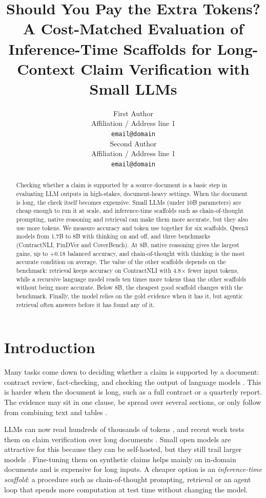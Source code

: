 \documentclass[11pt]{article}
\title{Should You Pay the Extra Tokens? A Cost-Matched Evaluation of Inference-Time Scaffolds for Long-Context Claim Verification with Small LLMs}
\author{First Author \\
  Affiliation / Address line 1 \\
  \texttt{email@domain} \\\And
  Second Author \\
  Affiliation / Address line 1 \\
  \texttt{email@domain} \\}
\begin{document}
\maketitle
\begin{abstract}
Checking whether a claim is supported by a source document is a basic step
in evaluating LLM outputs in high-stakes, document-heavy settings. When the
document is long, the check itself becomes expensive. Small LLMs (under 10B
parameters) are cheap enough to run it at scale, and inference-time
scaffolds such as chain-of-thought prompting, native reasoning and
retrieval can make them more accurate, but they also use more tokens. We
measure accuracy and token use together for six scaffolds, Qwen3 models
from 1.7B to 8B with thinking on and off, and three benchmarks
(ContractNLI, FinDVer and CoverBench). At 8B, native reasoning gives the
largest gains, up to $+0.18$ balanced accuracy, and chain-of-thought with
thinking is the most accurate condition on average. The value of the other
scaffolds depends on the benchmark: retrieval keeps accuracy on
ContractNLI with 4.8$\times$ fewer input tokens, while a recursive language
model reads ten times more tokens than the other scaffolds without being
more accurate. Below 8B, the cheapest good scaffold changes with the
benchmark. Finally, the model relies on the gold evidence when it has it,
but agentic retrieval often answers before it has found any of it.
\end{abstract}

\section{Introduction}
\label{sec:intro}

Many tasks come down to deciding whether a claim is supported by a
document: contract review, fact-checking, and checking the output of
language models \citep{jacovi2024coverbench}. This is harder when the
document is long, such as a full contract or a quarterly report. The
evidence may sit in one clause, be spread over several sections, or only
follow from combining text and tables
\citep{koreeda-manning-2021-contractnli, zhao-etal-2024-findver}.

LLMs can now read hundreds of thousands of tokens
\citep{gao2025longcontext, yang2025qwen3}, and recent work tests them on
claim verification over long documents \citep{karpinska2024nocha,
zhao-etal-2024-findver, elaraby2025synclaimeval}. Small open models are
attractive for this because they can be self-hosted, but they still trail
larger models \citep{zhao-etal-2024-findver, karpinska2024nocha}.
Fine-tuning them on synthetic claims helps mainly on in-domain documents
\citep{tang2024minicheck, pham2025clipper, elaraby2025synclaimeval} and is
expensive for long inputs. A cheaper option is an \emph{inference-time
scaffold}: a procedure such as chain-of-thought prompting, retrieval or an
agent loop that spends more computation at test time without changing the
model.
\end{document}
